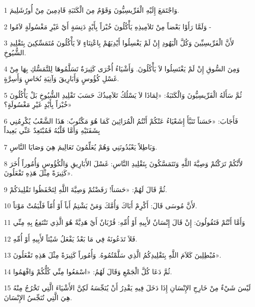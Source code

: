 \par 1 وَاجْتَمَعَ إِلَيْهِ الْفَرِّيسِيُّونَ وَقَوْمٌ مِنَ الْكَتَبَةِ قَادِمِينَ مِنْ أُورُشَلِيمَ.
\par 2 وَلَمَّا رَأَوْا بَعْضاً مِنْ تَلاَمِيذِهِ يَأْكُلُونَ خُبْزاً بِأَيْدٍ دَنِسَةٍ أَيْ غَيْرِ مَغْسُولَةٍ لاَمُوا -
\par 3 لأَنَّ الْفَرِّيسِيِّينَ وَكُلَّ الْيَهُودِ إِنْ لَمْ يَغْسِلُوا أَيْدِيَهُمْ بِاعْتِنَاءٍ لاَ يَأْكُلُونَ مُتَمَسِّكِينَ بِتَقْلِيدِ الشُّيُوخِ.
\par 4 وَمِنَ السُّوقِ إِنْ لَمْ يَغْتَسِلُوا لاَ يَأْكُلُونَ. وَأَشْيَاءُ أُخْرَى كَثِيرَةٌ تَسَلَّمُوهَا لِلتَّمَسُّكِ بِهَا مِنْ غَسْلِ كُؤُوسٍ وَأَبَارِيقَ وَآنِيَةِ نُحَاسٍ وَأَسِرَّةٍ.
\par 5 ثُمَّ سَأَلَهُ الْفَرِّيسِيُّونَ وَالْكَتَبَةُ: «لِمَاذَا لاَ يَسْلُكُ تَلاَمِيذُكَ حَسَبَ تَقْلِيدِ الشُّيُوخِ بَلْ يَأْكُلُونَ خُبْزاً بِأَيْدٍ غَيْرِ مَغْسُولَةٍ؟»
\par 6 فَأَجَابَ: «حَسَناً تَنَبَّأَ إِشَعْيَاءُ عَنْكُمْ أَنْتُمُ الْمُرَائِينَ كَمَا هُوَ مَكْتُوبٌ: هَذَا الشَّعْبُ يُكْرِمُنِي بِشَفَتَيْهِ وَأَمَّا قَلْبُهُ فَمُبْتَعِدٌ عَنِّي بَعِيداً
\par 7 وَبَاطِلاً يَعْبُدُونَنِي وَهُمْ يُعَلِّمُونَ تَعَالِيمَ هِيَ وَصَايَا النَّاسِ.
\par 8 لأَنَّكُمْ تَرَكْتُمْ وَصِيَّةَ اللَّهِ وَتَتَمَسَّكُونَ بِتَقْلِيدِ النَّاسِ: غَسْلَ الأَبَارِيقِ وَالْكُؤُوسِ وَأُمُوراً أُخَرَ كَثِيرَةً مِثْلَ هَذِهِ تَفْعَلُونَ».
\par 9 ثُمَّ قَالَ لَهُمْ: «حَسَناً! رَفَضْتُمْ وَصِيَّةَ اللَّهِ لِتَحْفَظُوا تَقْلِيدَكُمْ.
\par 10 لأَنَّ مُوسَى قَالَ: أَكْرِمْ أَبَاكَ وَأُمَّكَ وَمَنْ يَشْتِمُ أَباً أَوْ أُمّاً فَلْيَمُتْ مَوْتاً.
\par 11 وَأَمَّا أَنْتُمْ فَتَقُولُونَ: إِنْ قَالَ إِنْسَانٌ لأَبِيهِ أَوْ أُمِّهِ: قُرْبَانٌ أَيْ هَدِيَّةٌ هُوَ الَّذِي تَنْتَفِعُ بِهِ مِنِّي
\par 12 فَلاَ تَدَعُونَهُ فِي مَا بَعْدُ يَفْعَلُ شَيْئاً لأَبِيهِ أَوْ أُمِّهِ.
\par 13 مُبْطِلِينَ كَلاَمَ اللَّهِ بِتَقْلِيدِكُمُ الَّذِي سَلَّمْتُمُوهُ. وَأُمُوراً كَثِيرَةً مِثْلَ هَذِهِ تَفْعَلُونَ».
\par 14 ثُمَّ دَعَا كُلَّ الْجَمْعِ وَقَالَ لَهُمُ: «اسْمَعُوا مِنِّي كُلُّكُمْ وَافْهَمُوا.
\par 15 لَيْسَ شَيْءٌ مِنْ خَارِجِ الإِنْسَانِ إِذَا دَخَلَ فِيهِ يَقْدِرُ أَنْ يُنَجِّسَهُ لَكِنَّ الأَشْيَاءَ الَّتِي تَخْرُجُ مِنْهُ هِيَ الَّتِي تُنَجِّسُ الإِنْسَانَ.
